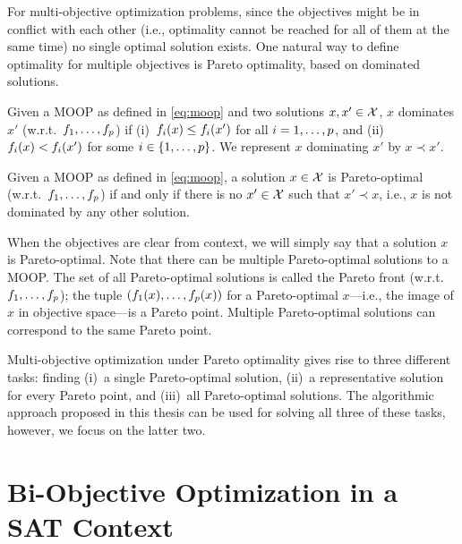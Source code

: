 For multi-objective optimization problems, since the objectives might be in conflict with each other (i.e., optimality cannot be reached for all of them at the same time) no single optimal solution exists.
One natural way to define optimality for multiple objectives is Pareto optimality, based on dominated solutions.
\begin{definition}
  Given a MOOP as defined in \cref{eq:moop} and two solutions $x,x' \in \mathcal{X}$, $x$ dominates $x'$ (w.r.t.\ $f_1,\dots,f_p$) if (i)~$f_i(x) \leq f_i(x')$ for all $i=1,\dots,p$, and (ii)~$f_i(x) < f_i(x')$ for some $i\in\{1,\dots,p\}$.
  We represent $x$ dominating $x'$ by $x \prec x'$.
\end{definition}
\begin{definition}
  Given a MOOP as defined in \cref{eq:moop}, a solution $x \in \mathcal{X}$ is Pareto-optimal (w.r.t.\ $f_1,\dots,f_p$) if and only if there is no $x' \in \mathcal{X}$ such that $x' \prec x$, i.e., $x$ is not dominated by any other solution.
\end{definition}
When the objectives are clear from context, we will simply say that a solution $x$ is Pareto-optimal.
Note that there can be multiple Pareto-optimal solutions to a MOOP.
The set of all Pareto-optimal solutions is called the Pareto front (w.r.t.\ $f_1,\dots,f_p$);
the tuple $(f_1(x),\dots,f_p(x))$ for a Pareto-optimal $x$---i.e., the image of $x$ in objective space---is a Pareto point.
Multiple Pareto-optimal solutions can correspond to the same Pareto point.

Multi-objective optimization under Pareto optimality gives rise to three different tasks:
finding (i)~a single Pareto-optimal solution, (ii)~a representative solution for every Pareto point, and (iii)~all Pareto-optimal solutions.
The algorithmic approach proposed in this thesis can be used for solving all three of these tasks, however, we focus on the latter two.

\section{Bi-Objective Optimization in a SAT Context\label{sec:biopt}}

